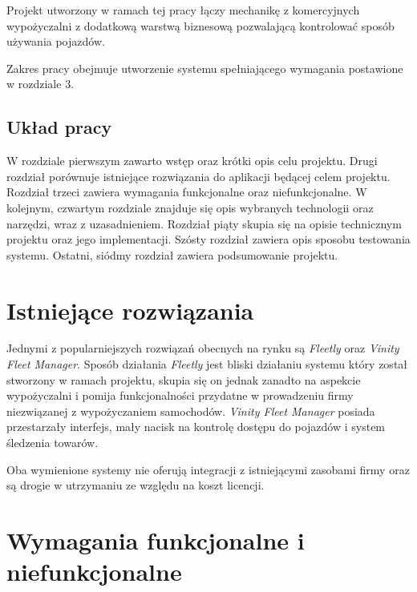 \documentclass[eng,printmode,openany]{mgr}
\begin{document}
Projekt utworzony w ramach tej pracy łączy mechanikę z komercyjnych wypożyczalni z dodatkową warstwą biznesową pozwalającą kontrolować sposób używania pojazdów.

Zakres pracy obejmuje utworzenie systemu spełniającego wymagania postawione w rozdziale 3.

\section{Układ pracy}
W rozdziale pierwszym zawarto wstęp oraz krótki opis celu projektu. Drugi rozdział porównuje istniejące rozwiązania do aplikacji będącej celem projektu. Rozdział trzeci zawiera wymagania funkcjonalne oraz niefunkcjonalne. W kolejnym, czwartym rozdziale znajduje się opis wybranych technologii oraz narzędzi, wraz z uzasadnieniem. Rozdział piąty skupia się na opisie technicznym projektu oraz jego implementacji. Szósty rozdział zawiera opis sposobu testowania systemu. Ostatni, siódmy rozdział zawiera podsumowanie projektu.

\newpage
\chapter{Istniejące rozwiązania}
Jednymi z popularniejszych rozwiązań obecnych na rynku są \textit{Fleetly} oraz \textit{Vinity Fleet Manager}. Sposób działania \textit{Fleetly} jest bliski działaniu systemu który został stworzony w ramach projektu, skupia się on jednak zanadto na aspekcie wypożyczalni i pomija funkcjonalności przydatne w prowadzeniu firmy niezwiązanej z wypożyczaniem samochodów. \textit{Vinity Fleet Manager} posiada przestarzały interfejs, mały nacisk na kontrolę dostępu do pojazdów i system śledzenia towarów. 

Oba wymienione systemy nie oferują integracji z istniejącymi zasobami firmy oraz są drogie w utrzymaniu ze względu na koszt licencji.
\newpage
\chapter{Wymagania funkcjonalne i niefunkcjonalne}
\end{document}
